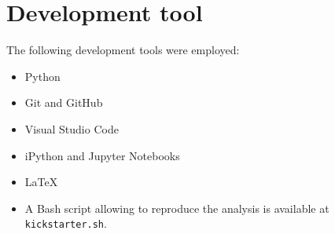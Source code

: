 \documentclass{article}
\begin{document}
\section{Development tool}
\label{sec:devTools}

The following development tools were employed:
\begin{itemize}
\item Python
\item Git and GitHub
\item Visual Studio Code
\item iPython and Jupyter Notebooks
\item LaTeX
\item A Bash script allowing to reproduce the analysis is available at  {\tt kickstarter.sh}.
\end{itemize}


\end{document}
